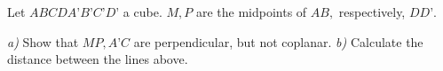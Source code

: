 Let $ ABCDA’B’C’D’ $ a cube. $ M,P $ are the midpoints of $ AB, $ respectively, $ DD’. $

\textit{a)} Show that $ MP, A’C $ are perpendicular, but not coplanar.
\textit{b)} Calculate the distance between the lines above.